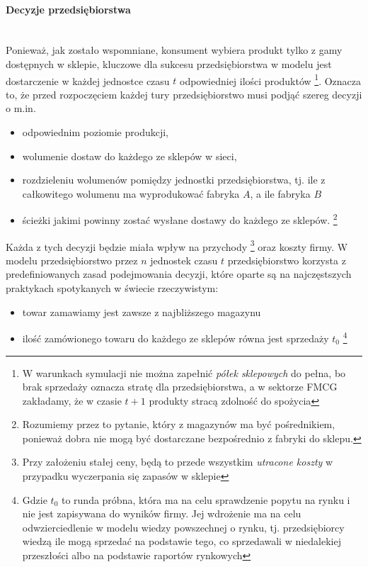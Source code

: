\documentclass[polish, twoside, 12pt, a4paper]{article}
\theoremstyle{definition}
\theoremstyle{plain}
\theoremstyle{remark}
\begin{document}
\paragraph{Decyzje przedsiębiorstwa}\mbox{}\\

Ponieważ, jak zostało wspomniane, konsument wybiera produkt tylko z gamy dostępnych w sklepie, kluczowe dla sukcesu przedsiębiorstwa w modelu jest dostarczenie w każdej jednostce czasu $t$ odpowiedniej ilości produktów \footnote{W warunkach symulacji nie można zapełnić \textit{półek sklepowych} do pełna, bo brak sprzedaży oznacza stratę dla przedsiębiorstwa, a w sektorze FMCG zakładamy, że w czasie $t+1$ produkty stracą zdolność do spożycia}. Oznacza to, że przed rozpoczęciem każdej tury przedsiębiorstwo musi podjąć szereg decyzji o m.in.

	\begin{itemize}
		\item odpowiednim poziomie produkcji,
		\item wolumenie dostaw do każdego ze sklepów w sieci,
		\item rozdzieleniu wolumenów pomiędzy jednostki przedsiębiorstwa, tj. ile z całkowitego wolumenu ma wyprodukować fabryka $A$, a ile fabryka $B$
	 	\item ścieżki jakimi powinny zostać wysłane dostawy do każdego ze sklepów. \footnote{Rozumiemy przez to pytanie, który z magazynów ma być pośrednikiem, ponieważ dobra nie mogą być dostarczane bezpośrednio z fabryki do sklepu.}
	\end{itemize}

Każda z tych decyzji będzie miała wpływ na przychody \footnote{Przy założeniu stałej ceny, będą to przede wszystkim \textit{utracone koszty} w przypadku wyczerpania się zapasów w sklepie} oraz koszty firmy. W modelu przedsiębiorstwo przez $n$ jednostek czasu $t$ przedsiębiorstwo korzysta z predefiniowanych zasad podejmowania decyzji, które oparte są na najczęstszych praktykach spotykanych w świecie rzeczywistym: 

	\begin{itemize}
		\item towar zamawiamy jest zawsze z najbliższego magazynu
		\item ilość zamówionego towaru do każdego ze sklepów równa jest sprzedaży $t_0$ \footnote{Gdzie $t_0$ to runda próbna, która ma na celu sprawdzenie popytu na rynku i nie jest zapisywana do wyników firmy. Jej wdrożenie ma na celu odwzierciedlenie w modelu wiedzy powszechnej o rynku, tj. przedsiębiorcy wiedzą ile mogą sprzedać na podstawie tego, co sprzedawali w niedalekiej przeszłości albo na podstawie raportów rynkowych}
	\end{itemize}
\end{document}
